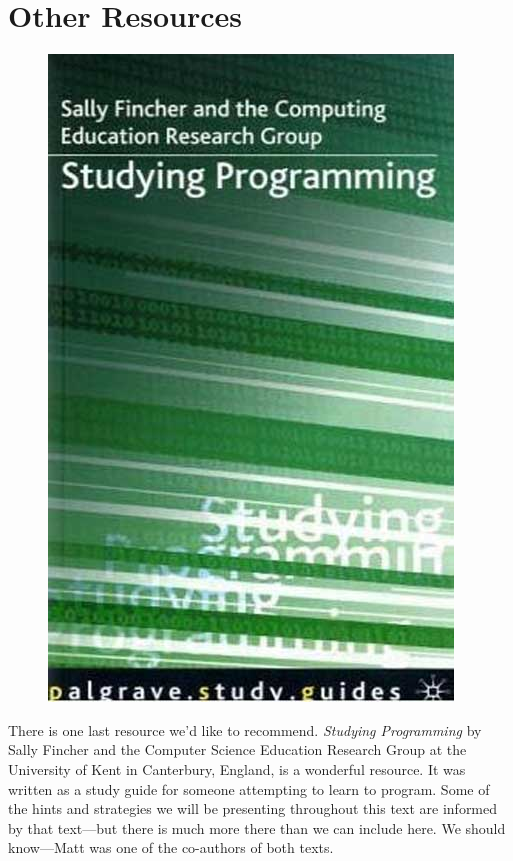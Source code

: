 \section{Other Resources}
\begin{figure}
	  \begin{center}
    	\includegraphics[width=0.8\linewidth]{images/studying-programming-cover}
  \end{center}
\end{figure}

There is one last resource we'd like to recommend. {\em Studying Programming} by Sally Fincher and the Computer Science Education Research Group at the University of Kent in Canterbury, England, is a wonderful resource. It was written as a study guide for someone attempting to learn to program. Some of the hints and strategies we will be presenting throughout this text are informed by that text---but there is much more there than we can include here. We should know---Matt was one of the co-authors of both texts.

